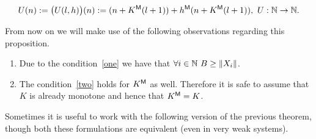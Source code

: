 \begin{prop}
\begin{align*}
 U(n)&:=\big(U(l,h)\big)(n):=(n + K\protect{^{\textsf{\upshape M}}}(l+1))+h\protect{^{\textsf{\upshape M}}}(n + K\protect{^{\textsf{\upshape M}}}(l+1)),\ U:\mathbb{N}\to\mathbb{N}.\\
\end{align*}
\end{prop}
%
\begin{rmk}
From now on we will make use of the following observations regarding this proposition.
\begin{enumerate}
\item Due to the condition~\eqref{one} we have that $\forall i\in\mathbb{N}\ B\geq\|X_i\|$.
\item The condition~\eqref{two} holds for $K\protect{^{\textsf{\upshape M}}}$ as well. Therefore it is safe to assume that $K$ is already monotone and hence that $K\protect{^{\textsf{\upshape M}}}=K$. 
\end{enumerate}
\end{rmk}

Sometimes it is useful to work with the following version of the previous theorem, though
both these formulations are equivalent (even in very weak systems).

